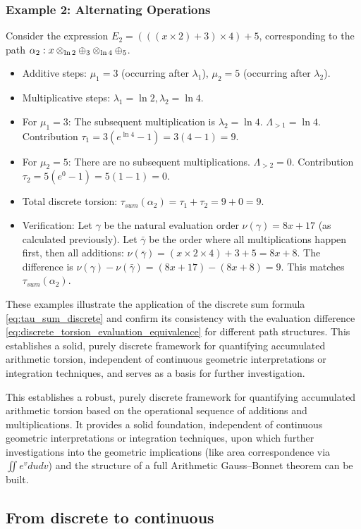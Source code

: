 \subsubsection*{Example 2: Alternating Operations}
Consider the expression $E_2 = (((x \times 2) + 3) \times 4) + 5$, corresponding to the path $\alpha_2: x \otimes_{\ln 2} \oplus_{3} \otimes_{\ln 4} \oplus_{5}$.
\begin{itemize}
    \item Additive steps: $\mu_1=3$ (occurring after $\lambda_1$), $\mu_2=5$ (occurring after $\lambda_2$).
    \item Multiplicative steps: $\lambda_1=\ln 2, \lambda_2=\ln 4$.
    \item For $\mu_1=3$: The subsequent multiplication is $\lambda_2=\ln 4$. $\Lambda_{>1} = \ln 4$. Contribution $\tau_1 = 3(e^{\ln 4}-1) = 3(4-1)=9$.
    \item For $\mu_2=5$: There are no subsequent multiplications. $\Lambda_{>2} = 0$. Contribution $\tau_2 = 5(e^{0}-1) = 5(1-1)=0$.
    \item Total discrete torsion: $\tau_{sum}(\alpha_2) = \tau_1 + \tau_2 = 9+0 = 9$.
    \item Verification: Let $\gamma$ be the natural evaluation order $\nu({\gamma}) = 8x+17$ (as calculated previously). Let $\bar{\gamma}$ be the order where all multiplications happen first, then all additions: $\nu({\bar{\gamma}}) = (x \times 2 \times 4) + 3 + 5 = 8x+8$. The difference is $\nu({\gamma}) - \nu({\bar{\gamma}}) = (8x+17) - (8x+8) = 9$. This matches $\tau_{sum}(\alpha_2)$.
\end{itemize}

These examples illustrate the application of the discrete sum formula \eqref{eq:tau_sum_discrete} and confirm its consistency with the evaluation difference \eqref{eq:discrete_torsion_evaluation_equivalence} for different path structures. This establishes a solid, purely discrete framework for quantifying accumulated arithmetic torsion, independent of continuous geometric interpretations or integration techniques, and serves as a basis for further investigation.

This establishes a robust, purely discrete framework for quantifying accumulated arithmetic torsion based on the operational sequence of additions and multiplications. It provides a solid foundation, independent of continuous geometric interpretations or integration techniques, upon which further investigations into the geometric implications (like area correspondence via $\iint e^v du dv$) and the structure of a full Arithmetic Gauss--Bonnet theorem can be built.

\subsection{From discrete to continuous}\label{subsec:discrete-to-continuous}



